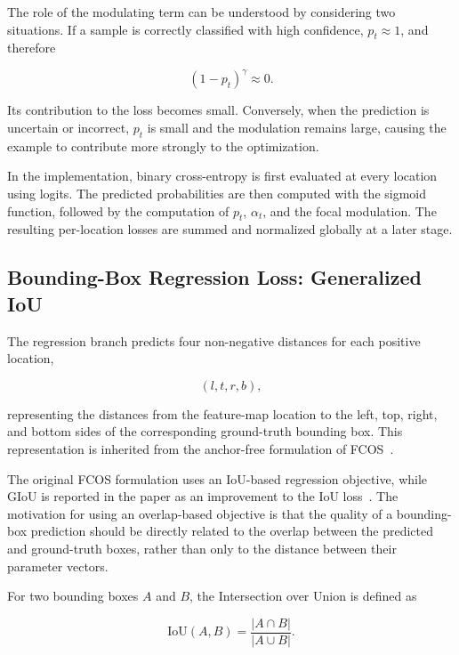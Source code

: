 \documentclass[11pt,a4paper]{article}
\begin{document}
The role of the modulating term can be understood by considering two
situations. If a sample is correctly classified with high confidence,
$p_t\approx1$, and therefore

\begin{equation}
(1-p_t)^\gamma \approx 0.
\end{equation}

Its contribution to the loss becomes small. Conversely, when the prediction
is uncertain or incorrect, $p_t$ is small and the modulation remains large,
causing the example to contribute more strongly to the optimization.

In the implementation, binary cross-entropy is first evaluated at every
location using logits. The predicted probabilities are then computed with
the sigmoid function, followed by the computation of $p_t$, $\alpha_t$, and
the focal modulation. The resulting per-location losses are summed and
normalized globally at a later stage.

\subsection{Bounding-Box Regression Loss: Generalized IoU}
\label{subsec:regression_loss}

The regression branch predicts four non-negative distances for each positive
location,

\begin{equation}
(l,t,r,b),
\end{equation}

representing the distances from the feature-map location to the left, top,
right, and bottom sides of the corresponding ground-truth bounding box.
This representation is inherited from the anchor-free formulation of
FCOS~\cite{tian2019fcos}.

The original FCOS formulation uses an IoU-based regression objective, while
GIoU is reported in the paper as an improvement to the IoU loss~\cite{tian2019fcos}.
The motivation for using an overlap-based objective is that the quality of a
bounding-box prediction should be directly related to the overlap between
the predicted and ground-truth boxes, rather than only to the distance
between their parameter vectors.

For two bounding boxes $A$ and $B$, the Intersection over Union is defined as

\begin{equation}
\mathrm{IoU}(A,B)
=
\frac{|A\cap B|}
{|A\cup B|}.
\end{equation}
\end{document}
